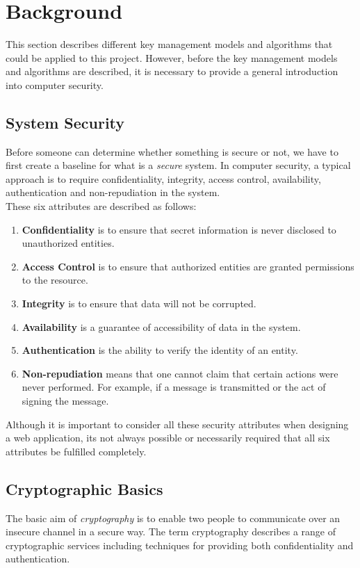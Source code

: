 \documentclass[11pt, a4paper, notitlepage]{article}
\begin{document}
\makeblankpage


\section{Background}
This section describes different key management models and algorithms that could be applied to this project. However, before the key management models and algorithms are described, it is necessary to provide a general introduction into computer security. 

\subsection*{System Security}
Before someone can determine whether something is secure or not, we have to first create a baseline for what is a \emph{secure} system. In computer security, a typical approach is to require confidentiality, integrity, access control, availability, authentication and non-repudiation in the system\cite{Pfleeger:2006:SC:1177321}. \\

These six attributes are described as follows:

\begin{enumerate}
\item \textbf{Confidentiality} is to ensure that secret information is never disclosed to unauthorized entities.
\item \textbf{Access Control} is to ensure that authorized entities are granted permissions to the resource.
\item \textbf{Integrity} is to ensure that data will not be corrupted.
\item \textbf{Availability} is a guarantee of accessibility of data in the system.
\item \textbf{Authentication} is the ability to verify the identity of an entity.
\item \textbf{Non-repudiation} means that one cannot claim that certain actions were never performed. For example, if a message is transmitted or the act of signing the message.
\end{enumerate}

Although it is important to consider all these security attributes when designing a web application, its not always possible or necessarily required that all six attributes be fulfilled completely. 

\subsection*{Cryptographic Basics}
The basic aim of \emph{cryptography} is to enable two people to communicate over an insecure channel in a secure way. The term cryptography describes a range of cryptographic services including techniques for providing both confidentiality and authentication. 
\end{document}
